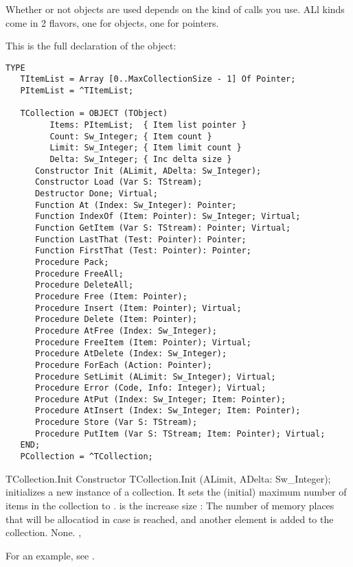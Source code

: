 Whether or not objects are used depends on the kind of calls you use.
ALl kinds come in 2 flavors, one for objects, one for pointers.

This is the full declaration of the  object:

\begin{verbatim}
TYPE
   TItemList = Array [0..MaxCollectionSize - 1] Of Pointer;
   PItemList = ^TItemList;

   TCollection = OBJECT (TObject)
         Items: PItemList;  { Item list pointer }
         Count: Sw_Integer; { Item count }
         Limit: Sw_Integer; { Item limit count }
         Delta: Sw_Integer; { Inc delta size }
      Constructor Init (ALimit, ADelta: Sw_Integer);
      Constructor Load (Var S: TStream);
      Destructor Done; Virtual;
      Function At (Index: Sw_Integer): Pointer;
      Function IndexOf (Item: Pointer): Sw_Integer; Virtual;
      Function GetItem (Var S: TStream): Pointer; Virtual;
      Function LastThat (Test: Pointer): Pointer;
      Function FirstThat (Test: Pointer): Pointer;
      Procedure Pack;
      Procedure FreeAll;
      Procedure DeleteAll;
      Procedure Free (Item: Pointer);
      Procedure Insert (Item: Pointer); Virtual;
      Procedure Delete (Item: Pointer);
      Procedure AtFree (Index: Sw_Integer);
      Procedure FreeItem (Item: Pointer); Virtual;
      Procedure AtDelete (Index: Sw_Integer);
      Procedure ForEach (Action: Pointer);
      Procedure SetLimit (ALimit: Sw_Integer); Virtual;
      Procedure Error (Code, Info: Integer); Virtual;
      Procedure AtPut (Index: Sw_Integer; Item: Pointer);
      Procedure AtInsert (Index: Sw_Integer; Item: Pointer);
      Procedure Store (Var S: TStream);
      Procedure PutItem (Var S: TStream; Item: Pointer); Virtual;
   END;
   PCollection = ^TCollection;
\end{verbatim}


\begin{procedure}{TCollection.Init}
\Declaration
Constructor TCollection.Init (ALimit, ADelta: Sw\_Integer);
\Description
{} initializes a new instance of a collection. It sets the (initial) maximum number
of items in the collection to .  is the increase
size : The number of memory places that will be allocatiod in case  is reached, 
and another element is added to the collection.
\Errors
None. 
\SeeAlso
{}, 
\end{procedure}

For an example, see .

